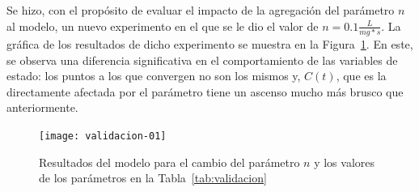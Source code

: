 Se hizo, con el propósito de evaluar el impacto de la agregación del parámetro $n$ al modelo, un nuevo experimento en el que se le dio el valor de $n = 0.1\frac{L}{mg*s}$. La gráfica de los resultados de dicho experimento se muestra en la Figura~\ref{fig:validacion-01}. En este, se observa una diferencia significativa en el comportamiento de las variables de estado: los puntos a los que convergen no son los mismos y, $C(t)$, que es la directamente afectada por el parámetro tiene un ascenso mucho más brusco que anteriormente.

\begin{figure}[ht!]
\centering
\texttt{[image: validacion-01]}
\caption{Resultados del modelo para el cambio del parámetro $n$ y los valores de los parámetros en la Tabla~\ref{tab:validacion}}
\label{fig:validacion-01}
\end{figure}

